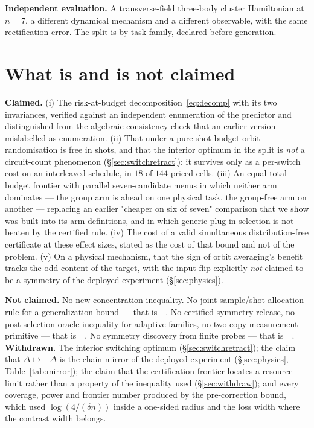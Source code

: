 \documentclass{article}
\providecommand{\citet}[1]{\citeauthor{#1}~\citep{#1}}
\begin{document}
\textbf{Independent evaluation.} A transverse-field three-body cluster Hamiltonian at $n=7$, a
different dynamical mechanism and a different observable, with the same rectification error. The
split is by task family, declared before generation.

\section{What is and is not claimed}

\textbf{Claimed.} (i) The risk-at-budget decomposition~\eqref{eq:decomp} with its two invariances,
verified against an independent enumeration of the predictor and distinguished from the algebraic
consistency check that an earlier version mislabelled as enumeration. (ii) That under a pure shot budget
orbit randomisation is free in shots, and that the interior optimum in the split is \emph{not} a
circuit-count phenomenon (\S\ref{sec:switchretract}): it survives only as a per-switch cost on an
interleaved schedule, in $18$ of $144$ priced cells. (iii) An equal-total-budget frontier with parallel
seven-candidate menus in which neither arm dominates --- the group arm is ahead on one physical task,
the group-free arm on another --- replacing an earlier "cheaper on six of seven" comparison that we show
was built into its arm definitions, and in which generic plug-in selection is not beaten by the certified
rule. (iv) The cost
of a valid simultaneous distribution-free certificate at these effect sizes, stated as the cost of that
bound and not of the problem. (v) On a physical mechanism, that the sign of orbit averaging's benefit
tracks the odd content of the target, with the input flip explicitly \emph{not} claimed to be a symmetry
of the deployed experiment (\S\ref{sec:physics}).

\textbf{Not claimed.} No new concentration inequality. No joint sample/shot allocation rule for a
generalization bound --- that is~\citet{catak2026budget}. No certified symmetry release, no
post-selection oracle inequality for adaptive families, no two-copy measurement primitive --- that
is~\citet{chen2026release}. No symmetry discovery from finite probes --- that is~\citet{chen2026symmetry}.
\textbf{Withdrawn.} The interior switching optimum (\S\ref{sec:switchretract}); the claim that
$\Delta\mapsto-\Delta$ is the chain mirror of the deployed experiment (\S\ref{sec:physics},
Table~\ref{tab:mirror}); the claim that the certification frontier locates a resource limit rather
than a property of the inequality used (\S\ref{sec:withdraw}); and every coverage, power and
frontier number produced by the pre-correction bound, which used $\log(4/(\delta n))$ inside a
one-sided radius and the loss width where the contrast width belongs.
\end{document}
